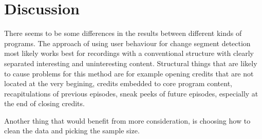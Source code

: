 \section{Discussion} \label{sec:discussion}


There seems to be some differences in the results between different kinds of programs. %
The approach of using user behaviour for change segment detection most likely works best for recordings with a conventional structure with clearly separated interesting and uninteresting content. Structural things that are likely to cause problems for this method are for example opening credits that are not located at the very begining, credits embedded to core program content, recapitulations of previous episodes, sneak peeks of future episodes, especially at the end of closing credits.

Another thing that would benefit from more consideration, is choosing how to clean the data and picking the sample size.


